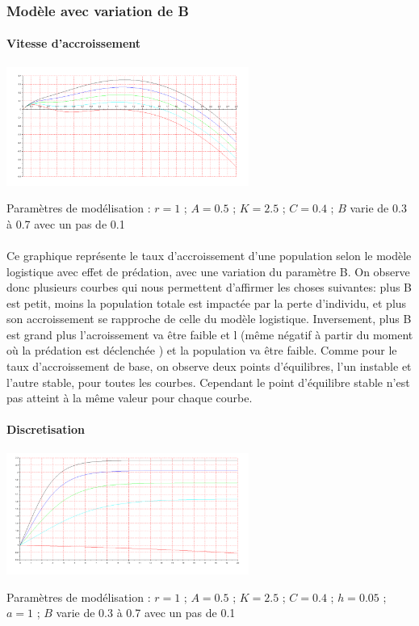 \documentclass{article}
\begin{document}
\subsubsection{Modèle avec variation de B}

\paragraph{Vitesse d'accroissement}
\begin{center}
\includegraphics[width=300px]{img/part2/LogB.png}
\end{center}
Paramètres de modélisation : $r=1$ ; $A=0.5$ ; $K=2.5$ ; $C=0.4$ ; $B$ varie de 0.3 à 0.7 avec un pas de 0.1
\paragraph{}
Ce graphique représente le taux d'accroissement d'une population selon le modèle logistique avec effet de prédation, avec une variation du paramètre B. On observe donc plusieurs courbes qui nous permettent d'affirmer les choses suivantes: plus B est petit, moins la population totale est impactée par la perte d'individu, et plus son accroissement se rapproche de celle du modèle logistique. Inversement, plus B est grand plus l'acroissement va être faible et l (même négatif à partir du moment où la prédation est déclenchée ) et la population va être faible.    Comme pour le taux d'accroissement de base, on observe deux points d'équilibres, l'un instable et l'autre stable, pour toutes les courbes. Cependant le point d'équilibre stable n'est pas atteint à la même valeur pour chaque courbe.

\paragraph{Discretisation}
\begin{center}
\includegraphics[width=300px]{img/part2/TrajB.png}
\end{center}
Paramètres de modélisation : $r=1$ ; $A=0.5$ ; $K=2.5$ ; $C=0.4$ ; $h=0.05$ ; $a=1$ ; $B$ varie de 0.3 à 0.7 avec un pas de 0.1
\end{document}

